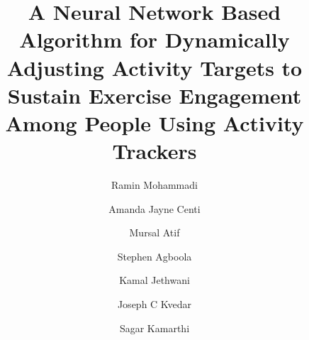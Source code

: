 \documentclass[preprint,12pt]{elsarticle}
\begin{document}
\begin{frontmatter}


\title{A Neural Network Based Algorithm for Dynamically Adjusting Activity Targets to Sustain Exercise Engagement Among People Using Activity Trackers}




\author[1,2]{Ramin Mohammadi} 
\author[2]{Amanda Jayne Centi}
\author[2]{Mursal Atif}
\author[2,3,4]{Stephen Agboola}
\author[2,3,4]{Kamal Jethwani}  
\author[2,3,4]{Joseph C Kvedar}  
\author[1,2]{Sagar Kamarthi }

\address[1]{Department of Mechanical and Industrial Engineering, Northeastern University, Boston, United States}
\address[2]{Connected Health Innovation, Partners Healthcare, Boston, United States.}
\address[3]{Department of Dermatology, Massachusetts General Hospital, Boston, United States.}
\address[4]{Harvard Medical School, Harvard University, Boston, United States.}


\end{frontmatter}
\end{document}
